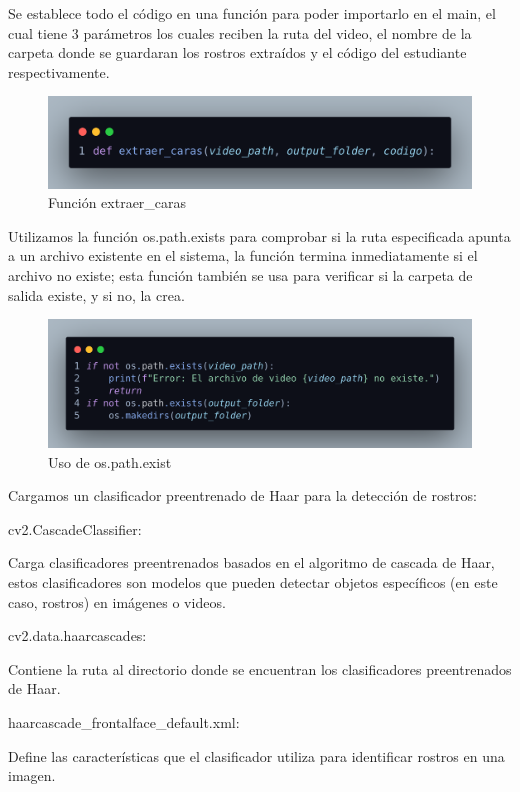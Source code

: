 \documentclass[12pt]{article}
\begin{document}
{Se establece todo el código en una función para poder importarlo en el main, el cual tiene 3 parámetros los cuales reciben la ruta del video, el nombre de la carpeta donde se guardaran los rostros extraídos y el código del estudiante respectivamente.

\begin{figure}[h]
    \centering
    \includegraphics[width=0.75\linewidth]{imagenes/des03.png}
    \caption{Función extraer\_caras}
    \label{fig:enter-label}
\end{figure}

Utilizamos la función os.path.exists para comprobar si la ruta especificada apunta a un archivo existente en el sistema, la función termina inmediatamente si el archivo no existe; esta función también se usa para verificar si la carpeta de salida existe, y si no, la crea.

\begin{figure}[h]
    \centering
    \includegraphics[width=0.9\linewidth]{imagenes/des04.png}
    \caption{Uso de os.path.exist}
    \label{fig:enter-label}
\end{figure}

Cargamos un clasificador preentrenado de Haar para la detección de rostros:

\begin{itemize}
    {\bfseries\item cv2.CascadeClassifier:} Carga clasificadores preentrenados basados en el algoritmo de cascada de Haar, estos clasificadores son modelos que pueden detectar objetos específicos (en este caso, rostros) en imágenes o videos.
    {\bfseries\item cv2.data.haarcascades:} Contiene la ruta al directorio donde se encuentran los clasificadores preentrenados de Haar.
    {\bfseries\item haarcascade\_frontalface\_default.xml:} Define las características que el clasificador utiliza para identificar rostros en una imagen.
\end{itemize}

}
\end{document}
